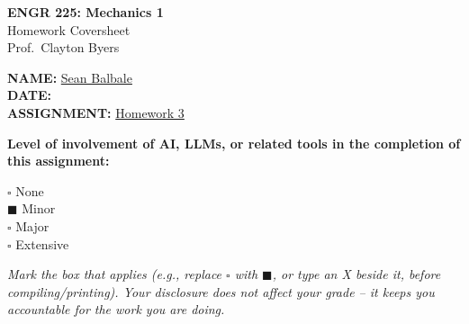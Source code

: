 \documentclass[11pt]{article}
\newcommand{\assignmentNumber}{3}
\newcommand{\assignedDate}{25 Sept 2026}
\newcommand{\dueDate}{2 Oct 2026 (11:59pm, Moodle)}
\begin{document}
\begin{titlepage}
    \centering
    \vspace*{2cm}
    {\LARGE \bfseries ENGR 225: Mechanics 1} \\[0.3cm]
    {\Large Homework Coversheet} \\[0.3cm]
    {\large Prof.\ Clayton Byers} \\[2cm]

    \begin{flushleft}
        \Large
        \textbf{NAME:} \underline{\hspace{0.5cm}Sean Balbale\hspace{6.5cm}} \\[1cm]
        \textbf{DATE:} \underline{\hspace{0.5cm}\hspace{9cm}} \\[1cm]
        \textbf{ASSIGNMENT:} \underline{\hspace{0.5cm}Homework 3\hspace{5.5cm}} \\[2cm]
    \end{flushleft}

    \large
    \textbf{Level of involvement of AI, LLMs, or related tools in the completion of this assignment:}

    \vspace{1cm}

    \begin{flushleft}
        \Large
        $\square$ \quad None \\[0.7cm]
        $\blacksquare$ \quad Minor \\[0.7cm]
        $\square$ \quad Major \\[0.7cm]
        $\square$ \quad Extensive \\[1.5cm]
    \end{flushleft}

    \normalsize
    \textit{Mark the box that applies (e.g., replace $\square$ with $\blacksquare$, or type an X beside it, before compiling/printing). Your disclosure does not affect your grade -- it keeps you accountable for the work you are doing.}

\end{titlepage}

\end{document}
